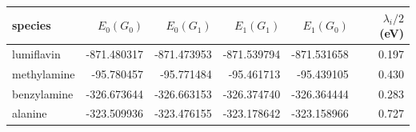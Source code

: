 \begin{tabular}{lrrrrr}
\toprule
species & $E_0(G_0)$ & $E_0(G_1)$ & $E_1(G_1)$ & $E_1(G_0)$ & $\lambda_i/2$ (eV) \\
\midrule
lumiflavin & -871.480317 & -871.473953 & -871.539794 & -871.531658 & 0.197 \\
methylamine & -95.780457 & -95.771484 & -95.461713 & -95.439105 & 0.430 \\
benzylamine & -326.673644 & -326.663153 & -326.374740 & -326.364444 & 0.283 \\
alanine & -323.509936 & -323.476155 & -323.178642 & -323.158966 & 0.727 \\
\bottomrule
\end{tabular}
